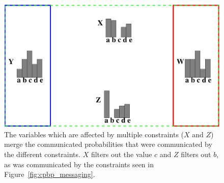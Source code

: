 \documentclass[../Document.tex]{subfiles}
\begin{document}
\begin{figure}[ht]
    \centering
    \includegraphics[scale=0.35]{images/CP-BP-3.pdf}
    \caption[\acrlong{cpbp} combining probabilities]{The variables which are affected by multiple constraints ($X$ and $Z$) merge the communicated probabilities that were communicated by the different constraints. $X$ filters out the value $c$ and $Z$ filters out $b$, as was communicated by the constraints seen in Figure~\ref{fig:cpbp_messaging}.}
    \label{fig:cpbp_combined}
\end{figure}
\end{document}
